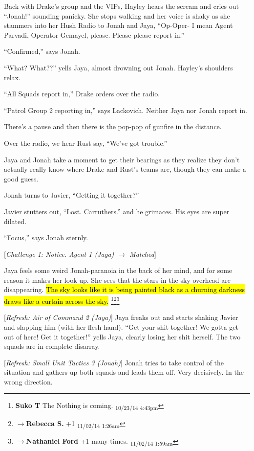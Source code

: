 Back with Drake's group and the VIPs, Hayley hears the scream and cries out ``Jonah!'' sounding panicky.   She stops walking and her voice is shaky as she stammers into her Hush Radio to Jonah and Jaya, ``Op-Oper- I mean Agent Parvadi, Operator Gemayel, please.  Please please report in.''

``Confirmed,'' says Jonah.

``What?  What??'' yells Jaya, almost drowning out Jonah.  Hayley's shoulders relax.

``All Squads report in,'' Drake orders over the radio.

``Patrol Group 2 reporting in,'' says Lackovich.  Neither Jaya nor Jonah report in.



There's a pause and then there is the pop-pop of gunfire in the distance.

Over the radio, we hear Rust say, ``We've got trouble.''

Jaya and Jonah take a moment to get their bearings as they realize they don't actually really know where Drake and Rust's teams are, though they can make a good guess.

Jonah turns to Javier, ``Getting it together?''

Javier stutters out, ``Lost.  Carruthers.'' and he grimaces.  His eyes are super dilated.

``Focus,'' says Jonah sternly.

{[}\textit{Challenge 1: Notice.  Agent 1 (Jaya) $\rightarrow$ Matched}{]}

Jaya feels some weird Jonah-paranoia in the back of her mind, and for some reason it makes her look up.  She sees that the stars in the sky overhead are disappearing.  \hl{The sky looks like it is being painted black as a churning darkness draws like a curtain across the sky.} \footnote{\textbf{Suko T }The Nothing is coming. \textsubscript{10/23/14 4:43pm}}\footnote{$\rightarrow$\textbf{Rebecca S. }+1 \textsubscript{11/02/14 1:26am}}\footnote{$\rightarrow$\textbf{Nathaniel Ford }+1 many times. \textsubscript{11/02/14 1:59am}}

{[}\textit{Refresh: Air of Command 2 (Jaya)}{]}  Jaya freaks out and starts shaking Javier and slapping him (with her flesh hand).  ``Get your shit together!  We gotta get out of here!   Get it together!'' yells Jaya, clearly losing her shit herself. The two squads are in complete disarray.

{[}\textit{Refresh: Small Unit Tactics 3 (Jonah)}{]}  Jonah tries to take control of the situation and gathers up both squads and leads them off. Very decisively.  In the wrong direction.

